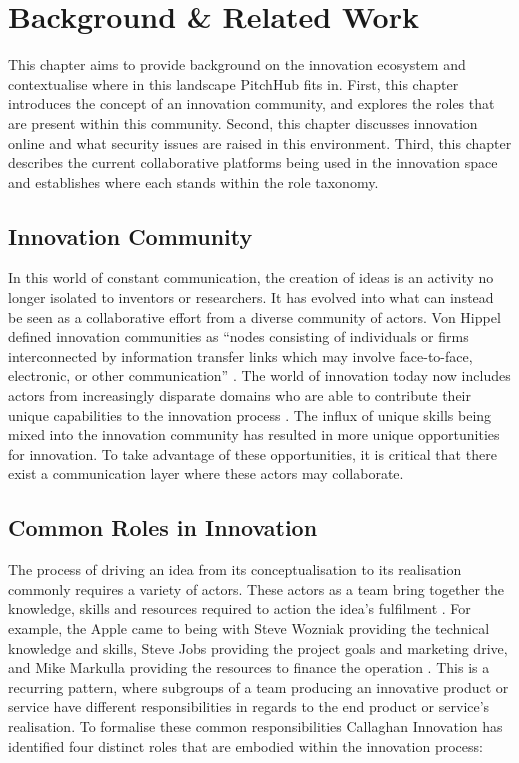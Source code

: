 \chapter{Background \& Related Work}\label{background}

This chapter aims to provide background on the innovation ecosystem and contextualise where in this landscape PitchHub fits in. First, this chapter introduces the concept of an innovation community, and explores the roles that are present within this community. Second, this chapter discusses innovation online and what security issues are raised in this environment. Third, this chapter describes the current collaborative platforms being used in the innovation space and establishes where each stands within the role taxonomy. 

\section{Innovation Community}
In this world of constant communication, the creation of ideas is an activity no longer isolated to inventors or researchers. It has evolved into what can instead be seen as a collaborative effort from a diverse community of actors. Von Hippel defined innovation communities as ``nodes consisting of individuals or firms interconnected by information transfer links which may involve face-to-face, electronic, or other communication'' \cite{von2005democratizing}. The world of innovation today now includes actors from increasingly disparate domains who are able to contribute their unique capabilities to the innovation process \cite{che2003optimal}. The influx of unique skills being mixed into the innovation community has resulted in more unique opportunities for innovation. To take advantage of these opportunities, it is critical that there exist a communication layer where these actors may collaborate.

\section{Common Roles in Innovation}\label{commonRolesInInnovation}

The process of driving an idea from its conceptualisation to its realisation commonly requires a variety of actors. These actors as a team bring together the knowledge, skills and resources required to action the idea's fulfilment \cite{engelberger1982robotics}. For example, the Apple  came to being with Steve Wozniak providing the technical knowledge and skills, Steve Jobs providing the project goals and marketing drive, and Mike Markulla providing the resources to finance the operation \cite{livingston2007founders}. This is a recurring pattern, where subgroups of a team producing an innovative product or service have different responsibilities in regards to the end product or service's realisation. To formalise these common responsibilities Callaghan Innovation has identified four distinct roles that are embodied within the innovation process:

